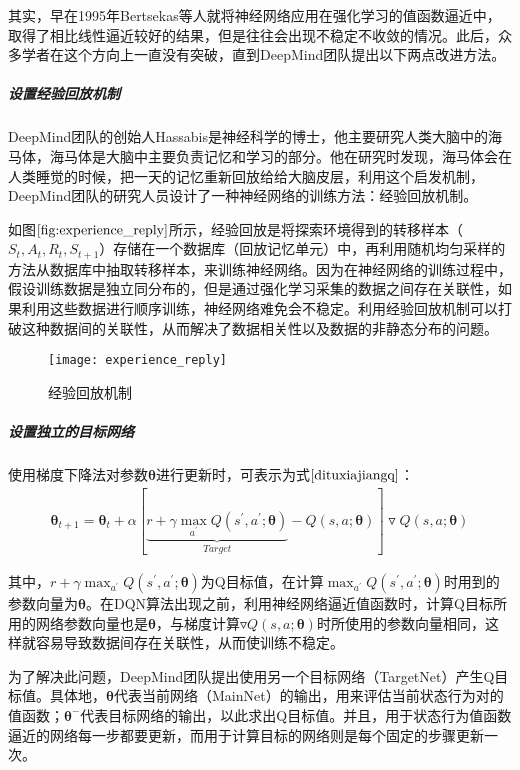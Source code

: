其实，早在1995年Bertsekas等人就将神经网络应用在强化学习的值函数逼近中，取得了相比线性逼近较好的结果，但是往往会出现不稳定不收敛的情况\citep{bertsekas1995neuro}。此后，众多学者在这个方向上一直没有突破，直到DeepMind团队提出以下两点改进方法。

 \subparagraph{设置经验回放机制}
DeepMind团队的创始人Hassabis是神经科学的博士，他主要研究人类大脑中的海马体，海马体是大脑中主要负责记忆和学习的部分。他在研究时发现，海马体会在人类睡觉的时候，把一天的记忆重新回放给给大脑皮层，利用这个启发机制，DeepMind团队的研究人员设计了一种神经网络的训练方法：经验回放机制。

如图$\ref{fig:experience_reply}$所示，经验回放是将探索环境得到的转移样本（$S_{t}, A_{t}, R_{t}, S_{t+1}$）存储在一个数据库（回放记忆单元）中，再利用随机均匀采样的方法从数据库中抽取转移样本，来训练神经网络。因为在神经网络的训练过程中，假设训练数据是独立同分布的，但是通过强化学习采集的数据之间存在关联性，如果利用这些数据进行顺序训练，神经网络难免会不稳定。利用经验回放机制可以打破这种数据间的关联性，从而解决了数据相关性以及数据的非静态分布的问题。
\begin{figure}[htbp]
\centering
\texttt{[image: experience\_reply]}
\caption{经验回放机制}
\label{fig:experience_reply}
\end{figure}

 \subparagraph{设置独立的目标网络}
使用梯度下降法对参数$\bm{\theta}$进行更新时，可表示为式$\eqref{dituxiajiangq}$：
\begin{equation}\label{dituxiajiangq}
\begin{aligned}
\bm{\theta}_{t+1}=\bm{\theta}_{t}+\alpha[\underbrace{r+\gamma \max_{a^{'}}Q(s^{'},a^{'};\bm{\theta})}_{Target}-Q(s,a;\bm{\theta})]\triangledown Q(s,a;\bm{\theta})
\end{aligned}
\end{equation}

其中，$r+\gamma \max_{a^{'}}Q(s^{'},a^{'};\bm{\theta})$为Q目标值，在计算$\max_{a^{'}}Q(s^{'},a^{'};\bm{\theta})$时用到的参数向量为$\bm{\theta}$。在DQN算法出现之前，利用神经网络逼近值函数时，计算Q目标所用的网络参数向量也是$\bm{\theta}$，与梯度计算$\triangledown Q(s,a;\bm{\theta})$时所使用的参数向量相同，这样就容易导致数据间存在关联性，从而使训练不稳定。

为了解决此问题，DeepMind团队提出使用另一个目标网络（TargetNet）产生Q目标值。具体地，$\bm{\theta}$代表当前网络（MainNet）的输出，用来评估当前状态行为对的值函数；$\bm{\theta}^{-}$代表目标网络的输出，以此求出Q目标值。并且，用于状态行为值函数逼近的网络每一步都要更新，而用于计算目标的网络则是每个固定的步骤更新一次。

